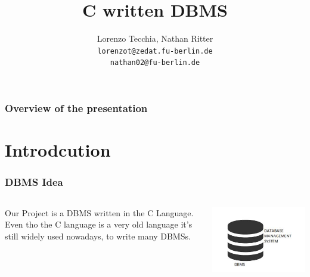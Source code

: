 \documentclass{beamer}
\title{C written DBMS}
\author[Tecchia, Ritter]{Lorenzo Tecchia, Nathan Ritter \\
\texttt{lorenzot@zedat.fu-berlin.de} \\
\texttt{nathan02@fu-berlin.de}}
\institute[FU Berlin]{Freie Universität Berlin}
\begin{document}
\begin{frame}
	\maketitle
\end{frame}

\begin{frame}
	\frametitle{Overview of the presentation}
	\tableofcontents
\end{frame}

\section{Introdcution}
\begin{frame}
	\frametitle{DBMS Idea}
	\begin{columns}
	\begin{column}{0.4\textwidth}	
		Our Project is a DBMS written in the C Language. \\ Even tho the C language is a very old language it's still widely used nowadays, to write many DBMSs.
	\end{column}
	
	\begin{column}{0.4\textwidth}

\includegraphics[width=1.4\columnwidth]{th-1536893874.jpg}			
	
	\end{column}

	\end{columns}
\end{frame}
\end{document}
